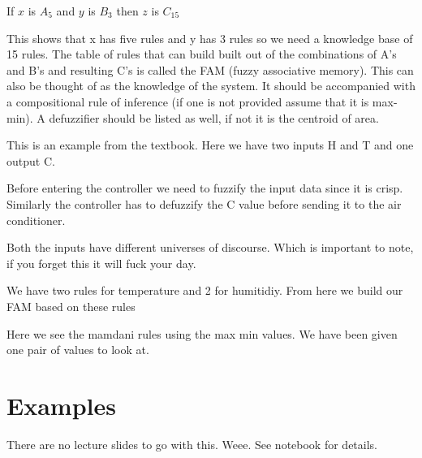 \documentclass{article}
\begin{document}
If $x$ is $A_5$ and $y$ is $B_3$ then $z$ is $C_15$

This shows that x has five rules and y has 3 rules so we need a knowledge base of 15 rules. The table of rules that can build built out of the combinations of A's and B's and resulting C's is called the FAM (fuzzy associative memory). This can also be thought of as the knowledge of the system. It should be accompanied with a compositional rule of inference (if one is not provided assume that it is max-min). A defuzzifier should be listed as well, if not it is the centroid of area.


This is an example from the textbook. Here we have two inputs H and T and one output C.

Before entering the controller we need to fuzzify the input data since it is crisp. Similarly the controller has to defuzzify the C value before sending it to the air conditioner.


Both the inputs have different universes of discourse. Which is important to note, if you forget this it will fuck your day.


We have two rules for temperature and 2 for humitidiy. From here we build our FAM based on these rules


Here we see the mamdani rules using the max min values. We have been given one pair of values to look at.

\section*{Examples}
\label{sec:examples}
There are no lecture slides to go with this. Weee. See notebook for details.



\end{document}
